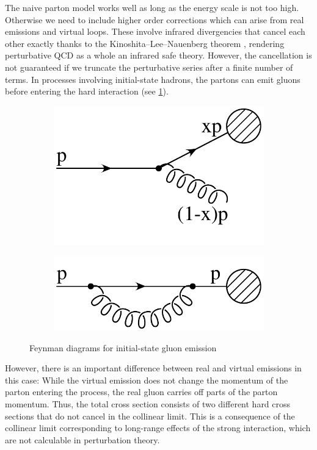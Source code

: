 The naive parton model works well as long as the energy scale is not too high.
Otherwise we need to include higher order corrections which can arise from real emissions and virtual loops.
These involve infrared divergencies that cancel each other exactly thanks to the Kinoshita–Lee–Nauenberg theorem \cite{kln_theorem1,kln_theorem2}, rendering perturbative QCD as a whole an infrared safe theory.
However, the cancellation is not guaranteed if we truncate the perturbative series after a finite number of terms.
In processes involving initial-state hadrons, the partons can emit gluons before entering the hard interaction (see \cref{fig:initial_gluon}).
%
\begin{figure}
\centering
	\begin{subfigure}[]{0.3\textwidth}
		\includegraphics[width=\textwidth]{images/initial_real.pdf}
	\end{subfigure}
	\hspace{1cm}
	\begin{subfigure}[]{0.3\textwidth}
		\includegraphics[width=\textwidth]{images/initial_virtual.pdf}
	\end{subfigure}
	\caption{Feynman diagrams for initial-state gluon emission}
	\label{fig:initial_gluon}
\end{figure}
%
However, there is an important difference between real and virtual emissions in this case:
While the virtual emission does not change the momentum of the parton entering the process, the real gluon carries off parts of the parton momentum.
Thus, the total cross section consists of two different hard cross sections that do not cancel in the collinear limit.
This is a consequence of the collinear limit corresponding to long-range effects of the strong interaction, which are not calculable in perturbation theory.

